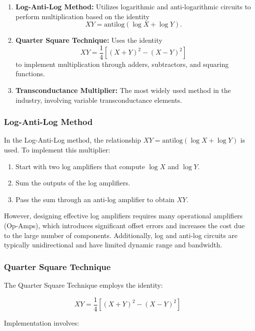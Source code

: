 \documentclass[a4paper,9pt,twoside,openany,twocolumn]{memoir}
\begin{document}
\begin{enumerate}
    \item \textbf{Log-Anti-Log Method:} Utilizes logarithmic and anti-logarithmic circuits to perform multiplication based on the identity
    \[
    XY = \text{antilog}(\log X + \log Y).
    \]
    
    \item \textbf{Quarter Square Technique:} Uses the identity
    \[
    XY = \frac{1}{4} \left[ (X + Y)^2 - (X - Y)^2 \right]
    \]
    to implement multiplication through adders, subtractors, and squaring functions.

    \item \textbf{Transconductance Multiplier:} The most widely used method in the industry, involving variable transconductance elements.
\end{enumerate}

\subsubsection*{Log-Anti-Log Method}

In the Log-Anti-Log method, the relationship \( XY = \text{antilog}(\log X + \log Y) \) is used. To implement this multiplier:

\begin{enumerate}
    \item Start with two log amplifiers that compute \( \log X \) and \( \log Y \).
    \item Sum the outputs of the log amplifiers.
    \item Pass the sum through an anti-log amplifier to obtain \( XY \).
\end{enumerate}

However, designing effective log amplifiers requires many operational amplifiers (Op-Amps), which introduces significant offset errors and increases the cost due to the large number of components. Additionally, log and anti-log circuits are typically unidirectional and have limited dynamic range and bandwidth.

\subsubsection*{Quarter Square Technique}

The Quarter Square Technique employs the identity:

\[
XY = \frac{1}{4} \left[(X + Y)^2 - (X - Y)^2\right]
\]

Implementation involves:
\end{document}
